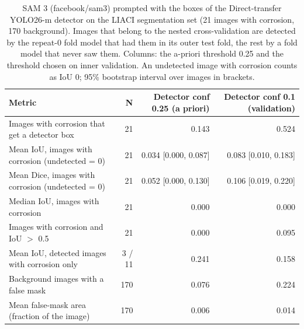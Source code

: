 \begin{table}[htbp]
\centering
\caption{SAM 3 (facebook/sam3) prompted with the boxes of the Direct-transfer YOLO26-m detector on the LIACI segmentation set (21 images with corrosion, 170 background). Images that belong to the nested cross-validation are detected by the repeat-0 fold model that had them in its outer test fold, the rest by a fold model that never saw them. Columns: the a-priori threshold 0.25 and the threshold chosen on inner validation. An undetected image with corrosion counts as IoU 0; 95\% bootstrap interval over images in brackets.}
\label{tab:sam3}
\begin{tabular}{lrrr}
\toprule
Metric & N & Detector conf 0.25 (a priori) & Detector conf 0.1 (validation) \\
\midrule
Images with corrosion that get a detector box & 21 & 0.143 & 0.524 \\
Mean IoU, images with corrosion (undetected = 0) & 21 & 0.034 [0.000, 0.087] & 0.083 [0.010, 0.183] \\
Mean Dice, images with corrosion (undetected = 0) & 21 & 0.052 [0.000, 0.130] & 0.106 [0.019, 0.220] \\
Median IoU, images with corrosion & 21 & 0.000 & 0.000 \\
Images with corrosion and IoU $>$ 0.5 & 21 & 0.000 & 0.095 \\
Mean IoU, detected images with corrosion only & 3 / 11 & 0.241 & 0.158 \\
Background images with a false mask & 170 & 0.076 & 0.224 \\
Mean false-mask area (fraction of the image) & 170 & 0.006 & 0.014 \\
\bottomrule
\end{tabular}
\end{table}
